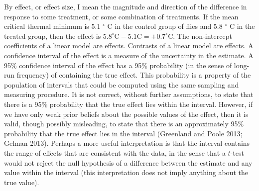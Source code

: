\documentclass[fleqn,10pt,lineno]{wlpeerj} %
\theoremstyle{definition}
\theoremstyle{definition}
\theoremstyle{definition}
\theoremstyle{remark}
\begin{document}
By effect, or effect size, I mean the magnitude and direction of the
difference in response to some treatment, or some combination of
treatments. If the mean critical thermal minimum is 5.1 \(^\circ\) C in
the control group of flies and 5.8 \(^\circ\) C in the treated group,
then the effect is
\(5.8 ^\circ \textrm{C} - 5.1 \textrm{C} = +0.7 ^\circ \textrm{C}\). The
non-intercept coefficients of a linear model are effects. Contrasts of a
linear model are effects. A confidence interval of the effect is a
measure of the uncertainty in the estimate. A 95\% confidence interval
of the effect has a 95\% probability (in the sense of long-run
frequency) of containing the true effect. This probability is a property
of the population of intervals that could be computed using the same
sampling and measuring procedure. It is not correct, without further
assumptions, to state that there is a 95\% probability that the true
effect lies within the interval. However, if we have only weak prior
beliefs about the possible values of the effect, then it is valid,
though possibly misleading, to state that there is an approximately 95\%
probability that the true effect lies in the interval (Greenland and
Poole 2013; Gelman 2013). Perhaps a more useful interpretation is that
the interval contains the range of effects that are consistent with the
data, in the sense that a \(t\)-test would not reject the null
hypothesis of a difference between the estimate and any value within the
interval (this interpretation does not imply anything about the true
value).
\end{document}
